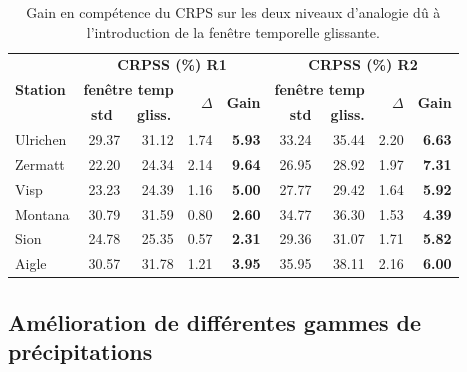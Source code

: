 \documentclass[hess]{copernicus}
\begin{document}
\begin{table}[htb]
	\caption{Gain en compétence du CRPS sur les deux niveaux d'analogie dû à l'introduction de la fenêtre temporelle glissante.}
	\begin{center}
		\begin{tabular}{l r r r r r r r r}
			\hline
			\multirow{3}{*}{\textbf{Station}} & \multicolumn{ 4}{c}{\textbf{CRPSS (\%) R1}} & \multicolumn{ 4}{c}{\textbf{CRPSS (\%) R2}} \\
			& \multicolumn{ 2}{c}{\textbf{fenêtre temp}} & \multirow{2}{*}{\textbf{$\Delta$}} & \multirow{2}{*}{\textbf{Gain}} & \multicolumn{ 2}{c}{\textbf{fenêtre temp}} & \multirow{2}{*}{\textbf{$\Delta$}} & \multirow{2}{*}{\textbf{Gain}} \\
			& \multicolumn{1}{c}{\textbf{std}} & \multicolumn{1}{c}{\textbf{gliss.}} &  &  & \textbf{std} & \textbf{gliss.} &  & \\ 
			\hline
			Ulrichen & 29.37 & 31.12 & 1.74 & \textbf{5.93} & 33.24 & 35.44 & 2.20 & \textbf{6.63} \\ \hline
			Zermatt & 22.20 & 24.34 & 2.14 & \textbf{9.64} & 26.95 & 28.92 & 1.97 & \textbf{7.31} \\ \hline
			Visp & 23.23 & 24.39 & 1.16 & \textbf{5.00} & 27.77 & 29.42 & 1.64 & \textbf{5.92} \\ \hline
			Montana & 30.79 & 31.59 & 0.80 &\textbf{ 2.60} & 34.77 & 36.30 & 1.53 & \textbf{4.39} \\ \hline
			Sion & 24.78 & 25.35 & 0.57 & \textbf{2.31} & 29.36 & 31.07 & 1.71 & \textbf{5.82} \\ \hline
			Aigle & 30.57 & 31.78 & 1.21 & \textbf{3.95} & 35.95 & 38.11 & 2.16 & \textbf{6.00} \\ \hline
		\end{tabular}
	\end{center}
	\label{tab:fenetre_glissante:Gains_CRPSS}
\end{table}


\subsection{Amélioration de différentes gammes de précipitations}
\label{sec:ameliorations:fenetre:gammes_precip}
\end{document}
